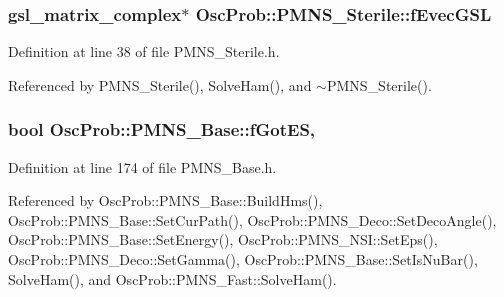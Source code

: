 \subsubsection[{\texorpdfstring{f\+Evec\+G\+SL}{fEvecGSL}}]{\setlength{\rightskip}{0pt plus 5cm}gsl\+\_\+matrix\+\_\+complex$\ast$ Osc\+Prob\+::\+P\+M\+N\+S\+\_\+\+Sterile\+::f\+Evec\+G\+SL\hspace{0.3cm}{\ttfamily [protected]}}\hypertarget{classOscProb_1_1PMNS__Sterile_a8ab71bc7de328eb6ba855904f365fb1d}{}\label{classOscProb_1_1PMNS__Sterile_a8ab71bc7de328eb6ba855904f365fb1d}


Definition at line 38 of file P\+M\+N\+S\+\_\+\+Sterile.\+h.



Referenced by P\+M\+N\+S\+\_\+\+Sterile(), Solve\+Ham(), and $\sim$\+P\+M\+N\+S\+\_\+\+Sterile().

\subsubsection[{\texorpdfstring{f\+Got\+ES}{fGotES}}]{\setlength{\rightskip}{0pt plus 5cm}bool Osc\+Prob\+::\+P\+M\+N\+S\+\_\+\+Base\+::f\+Got\+ES\hspace{0.3cm}{\ttfamily [protected]}, {\ttfamily [inherited]}}\hypertarget{classOscProb_1_1PMNS__Base_a6dc5cd010d2d70b2324745b4e53e9839}{}\label{classOscProb_1_1PMNS__Base_a6dc5cd010d2d70b2324745b4e53e9839}


Definition at line 174 of file P\+M\+N\+S\+\_\+\+Base.\+h.



Referenced by Osc\+Prob\+::\+P\+M\+N\+S\+\_\+\+Base\+::\+Build\+Hms(), Osc\+Prob\+::\+P\+M\+N\+S\+\_\+\+Base\+::\+Set\+Cur\+Path(), Osc\+Prob\+::\+P\+M\+N\+S\+\_\+\+Deco\+::\+Set\+Deco\+Angle(), Osc\+Prob\+::\+P\+M\+N\+S\+\_\+\+Base\+::\+Set\+Energy(), Osc\+Prob\+::\+P\+M\+N\+S\+\_\+\+N\+S\+I\+::\+Set\+Eps(), Osc\+Prob\+::\+P\+M\+N\+S\+\_\+\+Deco\+::\+Set\+Gamma(), Osc\+Prob\+::\+P\+M\+N\+S\+\_\+\+Base\+::\+Set\+Is\+Nu\+Bar(), Solve\+Ham(), and Osc\+Prob\+::\+P\+M\+N\+S\+\_\+\+Fast\+::\+Solve\+Ham().

